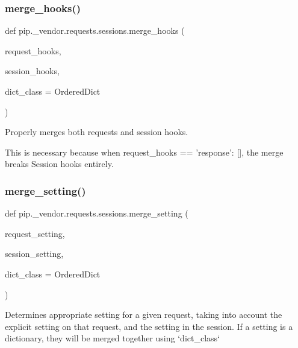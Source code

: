 \subsubsection{\texorpdfstring{merge\+\_\+hooks()}{merge\_hooks()}}
{\footnotesize\ttfamily def pip.\+\_\+vendor.\+requests.\+sessions.\+merge\+\_\+hooks (\begin{DoxyParamCaption}\item[{}]{request\+\_\+hooks,  }\item[{}]{session\+\_\+hooks,  }\item[{}]{dict\+\_\+class = {\ttfamily OrderedDict} }\end{DoxyParamCaption})}

\begin{DoxyVerb}Properly merges both requests and session hooks.

This is necessary because when request_hooks == {'response': []}, the
merge breaks Session hooks entirely.
\end{DoxyVerb}
 \mbox{\label{namespacepip_1_1__vendor_1_1requests_1_1sessions_a4f29ff9c970b63962ea01301a9b406e4}} 
\subsubsection{\texorpdfstring{merge\+\_\+setting()}{merge\_setting()}}
{\footnotesize\ttfamily def pip.\+\_\+vendor.\+requests.\+sessions.\+merge\+\_\+setting (\begin{DoxyParamCaption}\item[{}]{request\+\_\+setting,  }\item[{}]{session\+\_\+setting,  }\item[{}]{dict\+\_\+class = {\ttfamily OrderedDict} }\end{DoxyParamCaption})}

\begin{DoxyVerb}Determines appropriate setting for a given request, taking into account
the explicit setting on that request, and the setting in the session. If a
setting is a dictionary, they will be merged together using `dict_class`
\end{DoxyVerb}
 \mbox{\label{namespacepip_1_1__vendor_1_1requests_1_1sessions_acc89a2821821ae3e690b07883d088881}} 

